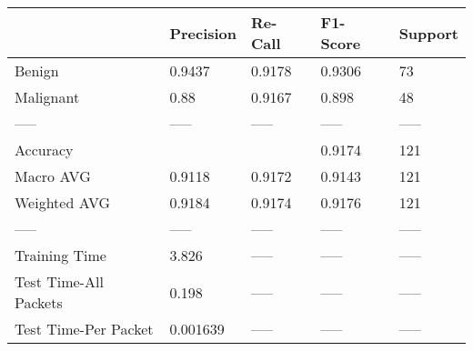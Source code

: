 \begin{tabular}{lllll}
\toprule
{} & Precision & Re-Call & F1-Score & Support \\
\midrule
Benign                &    0.9437 &  0.9178 &   0.9306 &      73 \\
Malignant             &      0.88 &  0.9167 &    0.898 &      48 \\
-----                 &     ----- &   ----- &    ----- &   ----- \\
Accuracy              &           &         &   0.9174 &     121 \\
Macro AVG             &    0.9118 &  0.9172 &   0.9143 &     121 \\
Weighted AVG          &    0.9184 &  0.9174 &   0.9176 &     121 \\
-----                 &     ----- &   ----- &    ----- &   ----- \\
Training Time         &     3.826 &   ----- &    ----- &   ----- \\
Test Time-All Packets &     0.198 &   ----- &    ----- &   ----- \\
Test Time-Per Packet  &  0.001639 &   ----- &    ----- &   ----- \\
\bottomrule
\end{tabular}
